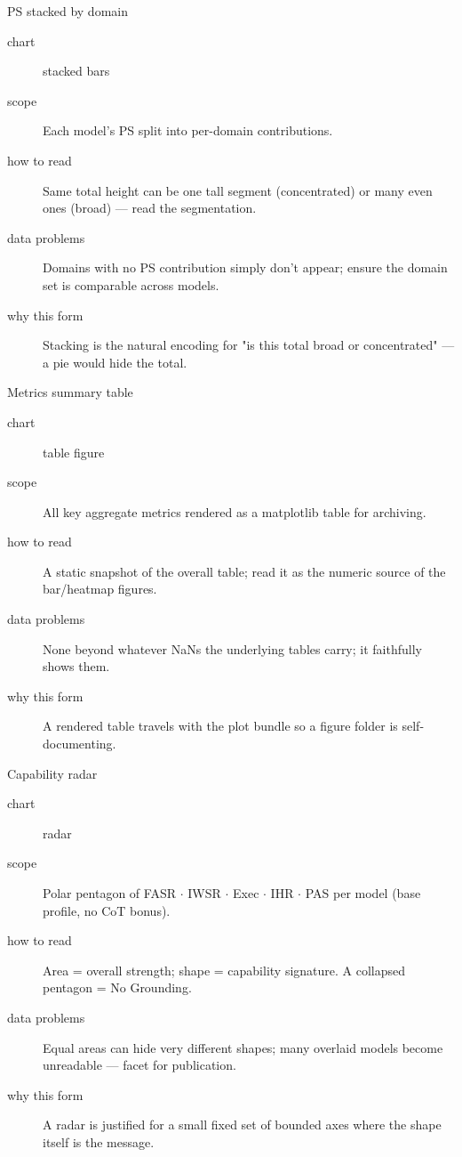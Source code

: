 \begin{bmplotcard}{PS stacked by domain}
\begin{description}
\item[chart] stacked bars
\item[scope] Each model's PS split into per-domain contributions.
\item[how to read] Same total height can be one tall segment (concentrated) or many even ones (broad) --- read the segmentation.
\item[data problems] Domains with no PS contribution simply don't appear; ensure the domain set is comparable across models.
\item[why this form] Stacking is the natural encoding for "is this total broad or concentrated" --- a pie would hide the total.
\end{description}
\end{bmplotcard}

\begin{bmplotcard}{Metrics summary table}
\begin{description}
\item[chart] table figure
\item[scope] All key aggregate metrics rendered as a matplotlib table for archiving.
\item[how to read] A static snapshot of the overall table; read it as the numeric source of the bar/heatmap figures.
\item[data problems] None beyond whatever NaNs the underlying tables carry; it faithfully shows them.
\item[why this form] A rendered table travels with the plot bundle so a figure folder is self-documenting.
\end{description}
\end{bmplotcard}

\begin{bmplotcard}{Capability radar}
\begin{description}
\item[chart] radar
\item[scope] Polar pentagon of FASR \(\cdot\) IWSR \(\cdot\) Exec \(\cdot\) IHR \(\cdot\) PAS per model (base profile, no CoT bonus).
\item[how to read] Area = overall strength; shape = capability signature. A collapsed pentagon = No Grounding.
\item[data problems] Equal areas can hide very different shapes; many overlaid models become unreadable --- facet for publication.
\item[why this form] A radar is justified for a small fixed set of bounded axes where the shape itself is the message.
\end{description}
\end{bmplotcard}

